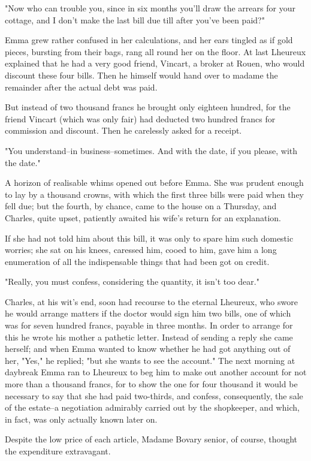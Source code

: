 \documentclass{tufte-book}
\begin{document}
"Now who can trouble you, since in six months you'll draw the arrears
for your cottage, and I don't make the last bill due till after you've
been paid?"

Emma grew rather confused in her calculations, and her ears tingled
as if gold pieces, bursting from their bags, rang all round her on
the floor. At last Lheureux explained that he had a very good friend,
Vincart, a broker at Rouen, who would discount these four bills. Then
he himself would hand over to madame the remainder after the actual debt
was paid.

But instead of two thousand francs he brought only eighteen hundred, for
the friend Vincart (which was only fair) had deducted two hundred francs
for commission and discount. Then he carelessly asked for a receipt.

"You understand--in business--sometimes. And with the date, if you
please, with the date."

A horizon of realisable whims opened out before Emma. She was prudent
enough to lay by a thousand crowns, with which the first three bills
were paid when they fell due; but the fourth, by chance, came to the
house on a Thursday, and Charles, quite upset, patiently awaited his
wife's return for an explanation.

If she had not told him about this bill, it was only to spare him such
domestic worries; she sat on his knees, caressed him, cooed to him, gave
him a long enumeration of all the indispensable things that had been got
on credit.

"Really, you must confess, considering the quantity, it isn't too dear."

Charles, at his wit's end, soon had recourse to the eternal Lheureux,
who swore he would arrange matters if the doctor would sign him two
bills, one of which was for seven hundred francs, payable in three
months. In order to arrange for this he wrote his mother a pathetic
letter. Instead of sending a reply she came herself; and when Emma
wanted to know whether he had got anything out of her, "Yes," he
replied; "but she wants to see the account." The next morning at
daybreak Emma ran to Lheureux to beg him to make out another account for
not more than a thousand francs, for to show the one for four thousand
it would be necessary to say that she had paid two-thirds, and confess,
consequently, the sale of the estate--a negotiation admirably carried
out by the shopkeeper, and which, in fact, was only actually known later
on.

Despite the low price of each article, Madame Bovary senior, of course,
thought the expenditure extravagant.
\end{document}
